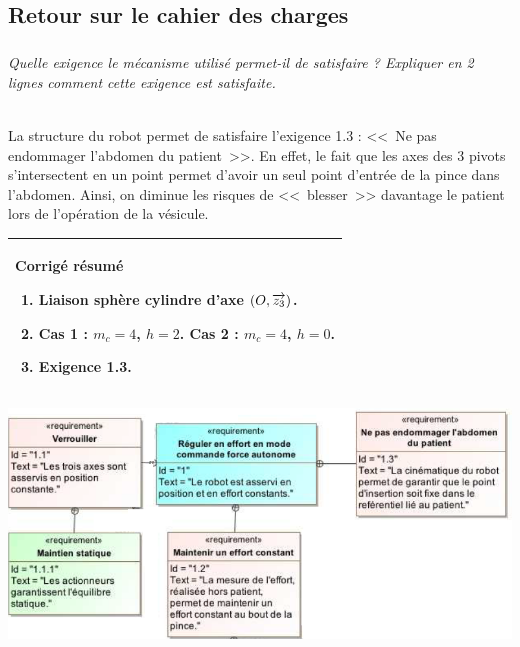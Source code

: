 \documentclass[10pt,fleqn]{article} %
\begin{document}
\begin{multicols}{2}
\subsection*{Retour sur le cahier des charges}


\subparagraph{}\textit{Quelle exigence le mécanisme utilisé permet-il de satisfaire ? Expliquer en 2 lignes comment cette exigence est satisfaite. }

\ifprof
\begin{corrige}~\\
La structure du robot permet de satisfaire l'exigence 1.3 : <<~Ne pas endommager l'abdomen du patient~>>. En effet, le fait que les axes des 3 pivots s'intersectent en un point permet d'avoir un seul point d'entrée de la pince dans l'abdomen. Ainsi, on diminue les risques de <<~blesser~>> davantage le patient lors de l'opération de la vésicule. 
\end{corrige}
\else
\fi


\ifprof
\else
\begin{center}
\begin{tabular}{|p{.95\linewidth}|}
\hline
\textbf{Corrigé résumé}
\begin{enumerate}
\item Liaison sphère cylindre d'axe $\left(O,\overrightarrow{z_3}\right)$.
\item Cas 1 : $m_c=4$, $h=2$. Cas 2 : $m_c=4$, $h=0$.
\item Exigence 1.3.
\end{enumerate} \\
\hline
\end{tabular}
\end{center}
\fi
\normalsize

\end{multicols}

\ifprof
\else

\vspace{1cm}
\begin{center}
\includegraphics[width=\linewidth]{images/fig_03}
\end{center}
\fi
\end{document}
